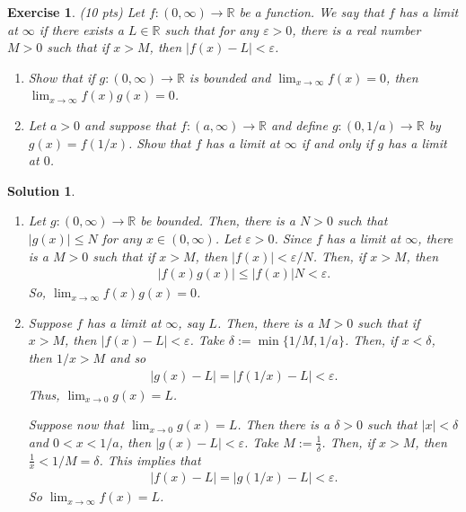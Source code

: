 \documentclass[12pt]{article}
\newcommand{\bR}{\mathbb{R}}
\newcommand{\ra}{\rightarrow}
\theoremstyle{plain}
\newtheorem{exer}{\textbf{Exercise}}}
\theoremstyle{plain}
\newtheorem*{sol}{\textbf{Solution}}}
\theoremstyle{plain}
\theoremstyle{plain}
\begin{document}
\begin{exer}
(10 pts)
Let $f : (0, \infty ) \ra \bR$ be a function. We say that $f$ has a limit at $\infty$ if there exists a $L \in \bR$ such that for any $\varepsilon > 0$, there is a real number $M > 0$ such that if $x > M$, then $|f(x) - L| < \varepsilon$. 
	\begin{enumerate}[label=\textbf{\alph*)}]
	\item Show that if $g: (0, \infty ) \ra \bR$ is bounded and $\lim_{x \ra \infty} f(x ) = 0$, then $\lim_{x \ra \infty} f(x) g(x) = 0$.
	\item Let $a > 0$ and suppose that $f: (a, \infty ) \ra \bR$ and define $g : (0, 1/a ) \ra \bR$ by $g(x) = f(1/x)$. Show that $f$ has a limit at $\infty$ if and only if $g$ has a limit at $0$.
	\end{enumerate}
\end{exer}
\begin{sol}
\begin{enumerate}[label=\textbf{\alph*)}]
\item Let $g : (0, \infty ) \ra \bR$ be bounded. Then, there is a $N > 0$ such that $|g(x)|\leq N$ for any $x \in (0, \infty )$. Let $\varepsilon > 0$. Since $f$ has a limit at $\infty$, there is a $M > 0$ such that if $x > M$, then $|f(x)| < \varepsilon/N$. Then, if $x > M$, then
	\begin{align*}
	|f(x) g(x)| \leq |f(x)| N < \varepsilon .
	\end{align*}
So, $\lim_{x \ra \infty} f(x) g(x) = 0$.
\item Suppose $f$ has a limit at $\infty$, say $L$. Then, there is a $M > 0$ such that if $x > M$, then $|f(x) - L| < \varepsilon$. Take $\delta := \min \{ 1/M , 1/a \}$. Then, if $x < \delta$, then $1/x > M$ and so
	\begin{align*}
	| g(x) - L | = |f(1/x) - L| < \varepsilon .
	\end{align*}
Thus, $\lim_{x \ra 0} g(x) = L$.

Suppose now that $\lim_{x \ra 0} g(x) = L$. Then there is a $\delta > 0$ such that $|x| < \delta$ and $0 < x < 1/a$, then $|g(x) - L| < \varepsilon$. Take $M := \frac{1}{\delta}$. Then, if $x > M$, then $\frac{1}{x} < 1/M = \delta$. This implies that
	\begin{align*}
	|f(x) - L| = |g(1/x) - L| < \varepsilon .
	\end{align*}
So $\lim_{x \ra \infty} f(x) = L$.
\end{enumerate}
\end{sol}
\end{document}

